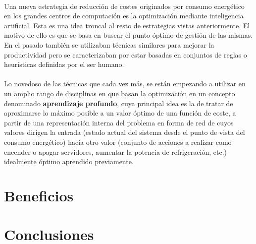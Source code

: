 \documentclass[10pt]{article}
\begin{document}
			\paragraph{}
			Una nueva estrategia de reducción de costes originados por consumo energético en los grandes centros de computación es la optimización mediante inteligencia artificial. Esta es una idea troncal al resto de estrategias vistas anteriormente. El motivo de ello es que se basa en buscar el punto óptimo de gestión de las mismas. En el pasado también se utilizaban técnicas similares para mejorar la productividad pero se caracterizaban por estar basadas en conjuntos de reglas o heurísticas definidas por el ser humano.

			\paragraph{}
			Lo novedoso de las técnicas que cada vez más, se están empezando a utilizar en un amplio rango de disciplinas en que basan la optimización en un concepto denominado \textbf{aprendizaje profundo}, cuya principal idea es la de tratar de aproximarse lo máximo posible a un valor óptimo de una función de coste, a partir de una representación interna del problema en forma de red de  cuyos valores dirigen la entrada (estado actual del sistema desde el punto de vista del consumo energético) hacia otro valor (conjunto de acciones a realizar como encender o apagar servidores, aumentar la potencia de refrigeración, etc.) idealmente óptimo aprendido previamente.


  \section{Beneficios}
	\label{sec:beneficios}

  	\paragraph{}

  \section{Conclusiones}
	\label{sec:conclusiones}
\end{document}

